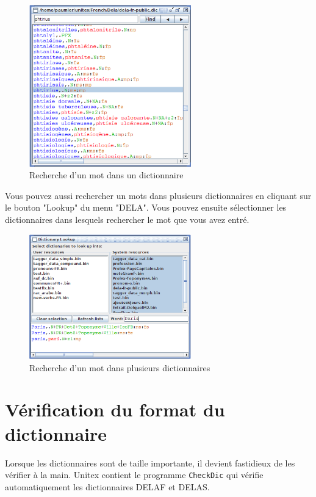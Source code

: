 \begin{figure}[h!]
\begin{center}
\includegraphics[width=7cm]{resources/img/fig3-2.png}
\caption{Recherche d'un mot dans un dictionnaire}
\end{center}
\end{figure}

\bigskip
\noindent
Vous pouvez aussi rechercher un mots dans plusieurs dictionnaires en cliquant sur le bouton "Lookup" du menu "DELA". Vous pouvez ensuite sélectionner les dictionnaires dans lesquels rechercher le mot que vous avez entré.

\begin{figure}[h!]
\begin{center}
\includegraphics[width=7cm]{resources/img/fig3-3.png}
\caption{Recherche d'un mot dans plusieurs dictionnaires}
\end{center}
\end{figure}

\bigskip
\noindent





\section{Vérification du format du dictionnaire}
 
Lorsque les dictionnaires sont de taille importante, il devient fastidieux de les vérifier à
la main. Unitex contient le programme \verb+CheckDic+
 qui vérifie automatiquement les dictionnaires DELAF et DELAS.

